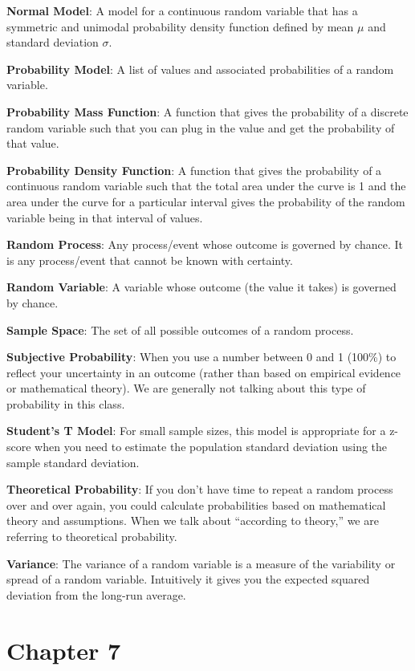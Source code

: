 \documentclass[
]{book}
\begin{document}
\textbf{Normal Model}: A model for a continuous random variable that has a symmetric and unimodal probability density function defined by mean \(\mu\) and standard deviation \(\sigma\).

\textbf{Probability Model}: A list of values and associated probabilities of a random variable.

\textbf{Probability Mass Function}: A function that gives the probability of a discrete random variable such that you can plug in the value and get the probability of that value.

\textbf{Probability Density Function}: A function that gives the probability of a continuous random variable such that the total area under the curve is 1 and the area under the curve for a particular interval gives the probability of the random variable being in that interval of values.

\textbf{Random Process}: Any process/event whose outcome is governed by chance. It is any process/event that cannot be known with certainty.

\textbf{Random Variable}: A variable whose outcome (the value it takes) is governed by chance.

\textbf{Sample Space}: The set of all possible outcomes of a random process.

\textbf{Subjective Probability}: When you use a number between 0 and 1 (100\%) to reflect your uncertainty in an outcome (rather than based on empirical evidence or mathematical theory). We are generally not talking about this type of probability in this class.

\textbf{Student's T Model}: For small sample sizes, this model is appropriate for a z-score when you need to estimate the population standard deviation using the sample standard deviation.

\textbf{Theoretical Probability}: If you don't have time to repeat a random process over and over again, you could calculate probabilities based on mathematical theory and assumptions. When we talk about ``according to theory,'' we are referring to theoretical probability.

\textbf{Variance}: The variance of a random variable is a measure of the variability or spread of a random variable. Intuitively it gives you the expected squared deviation from the long-run average.

\hypertarget{chapter-7}{%
\section{Chapter 7}\label{chapter-7}}
\end{document}

